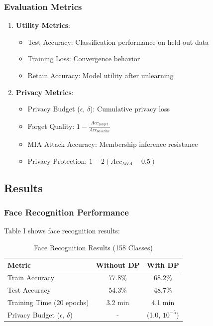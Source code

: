 \documentclass[conference]{IEEEtran}
\begin{document}
\subsubsection{Evaluation Metrics}

\begin{enumerate}
    \item \textbf{Utility Metrics}:
    \begin{itemize}
        \item Test Accuracy: Classification performance on held-out data
        \item Training Loss: Convergence behavior
        \item Retain Accuracy: Model utility after unlearning
    \end{itemize}

    \item \textbf{Privacy Metrics}:
    \begin{itemize}
        \item Privacy Budget ($\epsilon$, $\delta$): Cumulative privacy loss
        \item Forget Quality: $1 - \frac{Acc_{forget}}{Acc_{baseline}}$
        \item MIA Attack Accuracy: Membership inference resistance
        \item Privacy Protection: $1 - 2(Acc_{MIA} - 0.5)$
    \end{itemize}
\end{enumerate}

\subsection{Results}

\subsubsection{Face Recognition Performance}

Table I shows face recognition results:

\begin{table}[h]
\centering
\caption{Face Recognition Results (158 Classes)}
\begin{tabular}{@{}lcc@{}}
\toprule
\textbf{Metric} & \textbf{Without DP} & \textbf{With DP} \\ \midrule
Train Accuracy & 77.8\% & 68.2\% \\
Test Accuracy & 54.3\% & 48.7\% \\
Training Time (20 epochs) & 3.2 min & 4.1 min \\
Privacy Budget ($\epsilon$, $\delta$) & - & (1.0, $10^{-5}$) \\
\bottomrule
\end{tabular}
\end{table}
\end{document}
